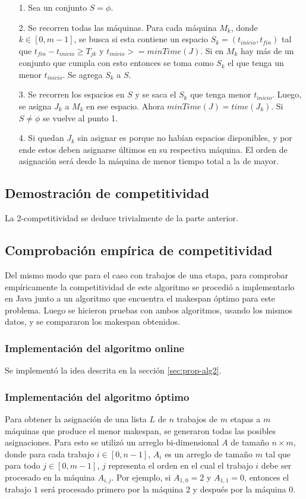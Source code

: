 \documentclass[12pt,letterpaper]{article}
\begin{document}
\begin{itemize}
\item[1.] Sea un conjunto $S = \phi$.
\item[2.] Se recorren todas las máquinas. Para cada máquina $M_{k}$, donde $k \in [0, m-1]$, se busca si esta contiene un espacio $S_{k} = (t_{inicio}, t_{fin})$ tal que $t_{fin} - t_{inicio} \geq T_{jk}$ y $t_{inicio} >= minTime(J)$. Si en $M_{k}$ hay más de un conjunto que cumpla con esto entonces se toma como $S_{k}$ el que tenga un menor $t_{inicio}$. Se agrega $S_{k}$ a $S$.
\item[3.] Se recorren los espacios en $S$ y se saca el $S_{k}$ que tenga menor $t_{inicio}$. Luego, se asigna $J_{k}$ a $M_{k}$ en ese espacio. Ahora $minTime(J) = time(J_{k})$. Si $S \not = \phi$ se vuelve al punto 1.
\item[4.] Si quedan $J_{k}$ sin asignar es porque no habían espacios disponibles, y por ende estos deben asignarse últimos en su respectiva máquina. El orden de asignación será desde la máquina de menor tiempo total a la de mayor.
\end{itemize}
	
\subsection{Demostración de competitividad}
La 2-competitividad se deduce trivialmente de la parte anterior.

\subsection{Comprobación empírica de competitividad}
Del mismo modo que para el caso con trabajos de una etapa, para comprobar empíricamente la competitividad de este algoritmo se procedió a implementarlo en Java junto a un algoritmo que encuentra el makespan óptimo para este problema. Luego se hicieron pruebas con ambos algoritmos, usando los mismos datos, y se compararon los makespan obtenidos.

\subsubsection{Implementación del algoritmo online}
Se implementó la idea descrita en la sección \ref{sec:prop-alg2}.

\subsubsection{Implementación del algoritmo óptimo}
Para obtener la asignación de una lista $L$ de $n$ trabajos de $m$ etapas a $m$ máquinas que produce el menor makespan, se generaron todas las posibles asignaciones. Para esto se utilizó un arreglo bi-dimensional $A$ de tamaño $n \times m$, donde para cada trabajo $i \in [0, n-1]$, $A_{i}$ es un arreglo de tamaño $m$ tal que para todo $j \in [0, m-1]$, $j$ representa el orden en el cual el trabajo $i$ debe ser procesado en la máquina $A_{i,j}$. Por ejemplo, si $A_{1,0} = 2$ y $A_{1,1} = 0$, entonces el trabajo $1$ será procesado primero por la máquina $2$ y después por la máquina $0$. \\
\end{document}
